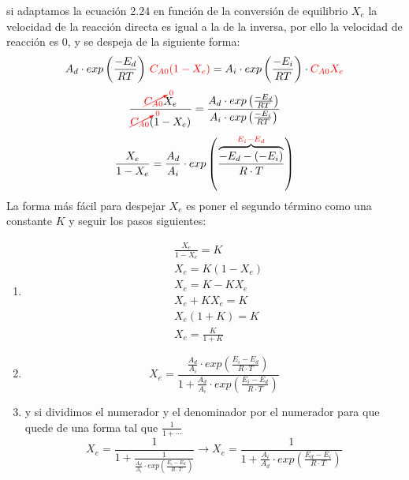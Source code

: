 si adaptamos la ecuación 2.24 en función de la conversión de equilibrio $X_{e}$ la velocidad de la reacción directa es igual a la de la inversa, por ello la velocidad de reacción es 0, y se despeja de la siguiente forma:
\begin{equation}
    A_d \cdot exp\left({\frac{-E_d}{RT}}\right) \hspace{0.2em}\textcolor{red}{C_{A0}(1-X_e)} = A_i \cdot exp\left({\frac{-E_i}{RT}}\right)\cdot \textcolor{red}{C_{A0}X_e}
\end{equation}
\begin{equation}
    \frac{\textcolor{red}{\cancelto{0}{C_{A0}}}X_e}{\textcolor{red}{\cancelto{0}{C_{A0}}}(1-X_e)} = \frac{A_d \cdot exp\left({\frac{-E_d}{RT}}\right)}{A_i \cdot exp\left({\frac{-E_i}{RT}}\right)}
\end{equation}
\begin{equation}
    \frac{X_e}{1-X_e} = \frac{A_d}{A_i} \cdot exp\left({\frac{\overbrace{- E_d - (-E_i)}^{\textcolor{red}{E_i-E_d}}}{R \cdot T}}\right)
\end{equation}
La forma más fácil para despejar $X_e$ es poner el segundo término como una constante $K$ y seguir los pasos siguientes:
\begin{enumerate}
    \item
          \begin{align*}
               & \frac{X_e}{1-X_e}  = K             \\
               & X_e                = K(1-X_e)      \\
               & X_e                = K - K X_e     \\
               & X_e + K X_e        = K             \\
               & X_e(1+K)           = K             \\
               & X_e                = \frac{K}{1+K}
          \end{align*}
    \item {\large\begin{equation*}
              X_e = \frac{\frac{A_d}{A_i} \cdot exp\left({\frac{E_i-E_d}{R \cdot T}}\right)}{1+\frac{A_d}{A_i} \cdot exp\left({\frac{E_i-E_d}{R \cdot T}}\right)}
          \end{equation*}}
    \item y si dividimos el numerador y el denominador por el numerador para que quede de una forma tal que $\frac{1}{1 + \cdots} $
          {\large \begin{equation*}
                      X_e = \frac{1}{1+\frac{1}{\frac{A_d}{A_i} \cdot exp\left({\frac{E_i-E_d}{R \cdot T}}\right)}} \rightarrow X_e = \frac{1}{1+\frac{A_i}{A_d} \cdot exp\left({\frac{E_d-E_i}{R \cdot T}}\right)}
                  \end{equation*}}
\end{enumerate}

